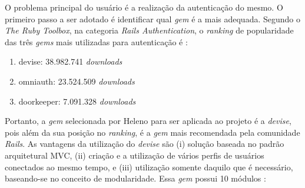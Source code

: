 O problema principal do usuário é a realização da autenticação do mesmo. O primeiro passo a ser adotado é identificar qual \textit{gem} é a mais adequada. Segundo o \textit{The Ruby Toolbox}, na categoria \textit{Rails Authentication}, o \textit{ranking} de popularidade das três \textit{gems} mais utilizadas para autenticação é \cite{rubytoolbox}:

\begin{enumerate}
	\item devise: 38.982.741 \textit{downloads}
	\item omniauth: 23.524.509 \textit{downloads}
	\item doorkeeper: 7.091.328 \textit{downloads}
\end{enumerate}

Portanto, a \textit{gem} selecionada por Heleno para ser aplicada ao projeto é a \textit{devise}, pois além da sua posição no \textit{ranking}, é a \textit{gem} mais recomendada pela comunidade \textit{Rails}. As vantagens da utilização do \textit{devise} são  (i) solução baseada no padrão arquitetural MVC, (ii) criação e a utilização de vários perfis de usuários conectados ao mesmo tempo, e (iii) utilização somente daquilo que é necessário, baseando-se no conceito de modularidade. Essa \textit{gem} possui 10 módulos \cite{gemdevise}: 

